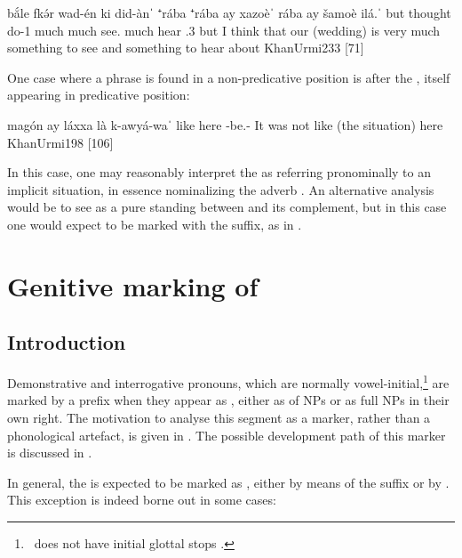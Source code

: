 {bắle fkə́r wad-én ki\cb{} did-ànˈ  ⁺rába ⁺rába \zero{} ay\cb{} xazoèˈ rába \zero{} ay\cb{} šamoè ilá.ˈ}
{but thought do-1\masc{} \rel\cb{}{} \pl{} much much \zero{} \lnk\cb{} see.\inf{} much \zero{} \lnk\cb{} hear \cop.3\fem}
{but I think that our (wedding) is very much something to see and something to hear about}
{KhanUrmi}{233 {[71]}}




One case where a \lnk* phrase is found in a non-predicative position is after the  , itself appearing in predicative position:


{magón \zero{} ay\cb{} láxxa là k-awyá-waˈ}
{like  \zero{} \lnk\cb{} here \neg{} \ind-be.\fem-\pst}
{It was not like (the situation) here}
{KhanUrmi}{198 {[106]}}

In this case, one may reasonably interpret the  as referring pronominally to an implicit situation, in essence nominalizing the adverb . An alternative analysis would be to see  as a pure \lnk* standing between  and its complement, but in this case one would expect  to be marked with the \cst* suffix, as in . 

\section{Genitive marking of \secns } \label{ss:JUrm_gen}

\subsection{Introduction}

Demonstrative and interrogative pronouns, which are normally vowel-initial,\footnote{\JUrm\ does not have initial glottal stops \citep[35]{KhanUrmi}.} are marked by a \gen* prefix  when they appear as \secns, either as  of NPs or as full NPs in their own right. The motivation to analyse this segment as a \gen* marker, rather than a phonological artefact, is given in . The possible development path of this marker is discussed in .



In general, the \prim is expected to be marked as \cst*, either by means of the \ed suffix or by . This exception is indeed borne out in some cases:

